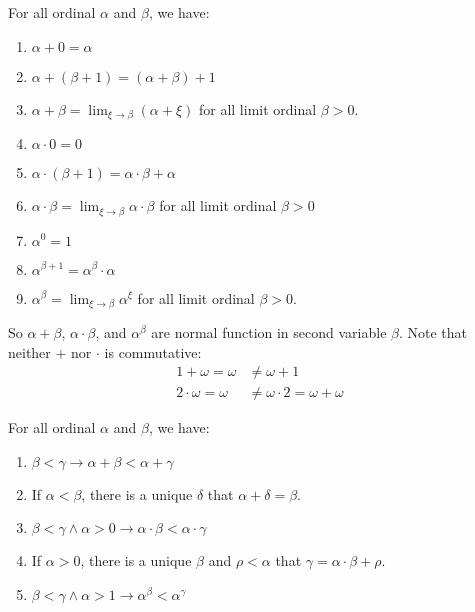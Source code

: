 \begin{theorem}
    For all ordinal $\alpha$ and $\beta$, we have:
    \begin{enumerate}
        \item $\alpha + 0 = \alpha$
        \item $\alpha + (\beta + 1) = (\alpha + \beta) + 1$
        \item $\displaystyle \alpha + \beta = \lim_{\xi \rightarrow \beta} (\alpha + \xi)$ for all limit ordinal $\beta > 0$.
        \item $\alpha \cdot 0 = 0$
        \item $\alpha \cdot (\beta + 1) = \alpha \cdot \beta + \alpha$
        \item $\displaystyle \alpha \cdot \beta = \lim_{\xi \rightarrow \beta} \alpha \cdot \beta$ for all limit ordinal $\beta > 0$
        \item $\alpha^0 = 1$
        \item $\alpha^{\beta + 1} = \alpha^\beta \cdot \alpha$
        \item $\displaystyle \alpha^\beta = \lim_{\xi \rightarrow \beta} \alpha^\xi$ for all limit ordinal $\beta > 0$.
    \end{enumerate}    
    So $\alpha + \beta$, $\alpha \cdot \beta$, and $\alpha^\beta$ are normal function in second variable $\beta$. Note that neither $+$ nor $\cdot$ is commutative:
    \begin{equation}
        \begin{aligned}
            1 + \omega = \omega &\neq \omega + 1 \\
            2 \cdot \omega = \omega &\neq \omega \cdot 2 = \omega + \omega
        \end{aligned}
    \end{equation}
\end{theorem}

\begin{theorem}
    For all ordinal $\alpha$ and $\beta$, we have:
    \begin{enumerate}
        \item $\beta < \gamma \rightarrow \alpha + \beta < \alpha + \gamma$
        \item If $ \alpha < \beta$, there is a unique $\delta$ that $\alpha + \delta = \beta$.
        \item $\beta < \gamma \wedge \alpha > 0 \rightarrow \alpha \cdot \beta < \alpha \cdot \gamma$
        \item If $\alpha > 0$, there is a unique $\beta$ and $\rho < \alpha$ that $\gamma = \alpha \cdot \beta + \rho$.
        \item $\beta < \gamma \wedge \alpha > 1 \rightarrow \alpha^\beta < \alpha^\gamma$
    \end{enumerate}
\end{theorem}


